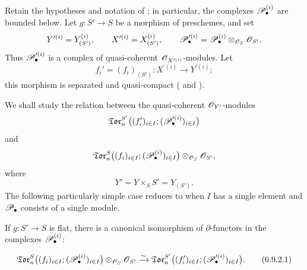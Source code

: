 \begin{env}[6.9.1]
\label{III.6.9.1}
Retain the hypotheses and notation of ; in
particular, the complexes $\mathscr{P}_\bullet^{(i)}$ are bounded below.
Let $g:S'\to S$ be a morphism of preschemes, and set
\[
  Y^{\prime(i)}=Y_{(S')}^{(i)},
  \qquad
  X^{\prime(i)}=X_{(S')}^{(i)},
  \qquad
  \mathscr{P}_\bullet^{\prime(i)}
  =
  \mathscr{P}_\bullet^{(i)}
  \otimes_{\mathscr{O}_S}\mathscr{O}_{S'}.
\]
Thus $\mathscr{P}_\bullet^{\prime(i)}$ is a complex of quasi-coherent
$\mathscr{O}_{X^{\prime(i)}}$-modules.  Let
\[
  f_i'=(f_i)_{(S')}:
  X^{\prime(i)}\longrightarrow Y^{\prime(i)};
\]
this morphism is separated and quasi-compact
( and ).

We shall study the relation between the quasi-coherent
$\mathscr{O}_{Y'}$-modules
\[
  \mathfrak{Tor}_n^{S'}
  \bigl(
    (f_i')_{i\in I};
    (\mathscr{P}_\bullet^{\prime(i)})_{i\in I}
  \bigr)
\]
and
\[
  \mathfrak{Tor}_n^S
  \bigl(
    (f_i)_{i\in I};
    (\mathscr{P}_\bullet^{(i)})_{i\in I}
  \bigr)
  \otimes_{\mathscr{O}_S}\mathscr{O}_{S'},
\]
where
\[
  Y'=Y\times_SS'=Y_{(S')}.
\]
The following particularly simple case reduces to
 when $I$ has a single element and
$\mathscr{P}_\bullet$ consists of a single module.
\end{env}

\begin{proposition}[6.9.2]
\label{III.6.9.2}
If $g:S'\to S$ is flat, there is a canonical isomorphism of
$\partial$-functors in the complexes $\mathscr{P}_\bullet^{(i)}$:
\begin{env}[6.9.2.1]
\label{III.6.9.2.1}
\[
  \mathfrak{Tor}_n^S
  \bigl(
    (f_i)_{i\in I};
    (\sh P_\bullet^{(i)})_{i\in I}
  \bigr)
  \otimes_{\sh O_S}\sh O_{S'}
  \xrightarrow{\sim}
  \mathfrak{Tor}_n^{S'}
  \bigl(
    (f_i')_{i\in I};
    (\sh P_\bullet^{\prime(i)})_{i\in I}
  \bigr).
  \tag{6.9.2.1}\label{III.6.9.2.1.eq}
\]
\end{env}
\end{proposition}

